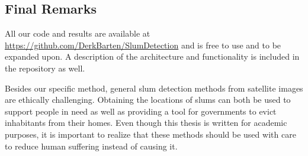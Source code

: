 
\subsection{Final Remarks}
All our code and results are available at \url{https://github.com/DerkBarten/SlumDetection} and is free to use and to be expanded upon. A description of the architecture and functionality is included in the repository as well.

Besides our specific method, general slum detection methods from satellite images are ethically challenging. Obtaining the locations of slums can both be used to support people in need as well as providing a tool for governments to evict inhabitants from their homes. Even though this thesis is written for academic purposes, it is important to realize that these methods should be used with care to reduce human suffering instead of causing it.









